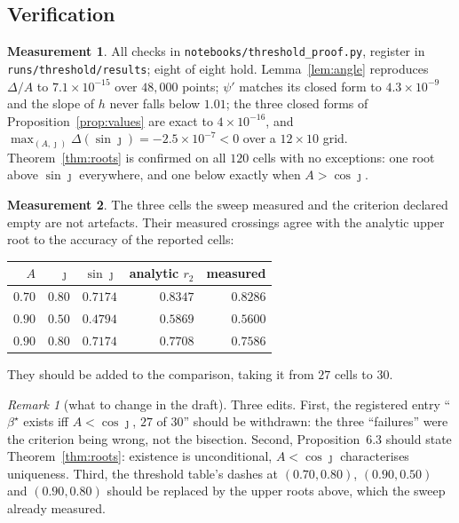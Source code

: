 \documentclass[11pt]{article}
\theoremstyle{definition}
\newtheorem{measurement}{Measurement}
\theoremstyle{remark}
\newtheorem{remark}{Remark}
\begin{document}
\subsection*{Verification}

\begin{measurement}
All checks in \texttt{notebooks/threshold\_proof.py}, register in
\texttt{runs/threshold/results}; eight of eight hold. Lemma~\ref{lem:angle} reproduces
$\Delta/A$ to $7.1\times10^{-15}$ over $48{,}000$ points; $\psi'$ matches its closed form to
$4.3\times10^{-9}$ and the slope of $h$ never falls below $1.01$; the three closed forms of
Proposition~\ref{prop:values} are exact to $4\times10^{-16}$, and
$\max_{(A,\jmath)}\Delta(\sin\jmath)=-2.5\times10^{-7}<0$ over a $12\times10$ grid.
Theorem~\ref{thm:roots} is confirmed on all $120$ cells with no exceptions: one root above
$\sin\jmath$ everywhere, and one below exactly when $A>\cos\jmath$.
\end{measurement}

\begin{measurement}\label{meas:recovered}
The three cells the sweep measured and the criterion declared empty are not artefacts. Their
measured crossings agree with the analytic upper root to the accuracy of the reported cells:
\begin{center}
\begin{tabular}{@{}rrrrr@{}}
\toprule
$A$ & $\jmath$ & $\sin\jmath$ & analytic $r_2$ & measured\\
\midrule
$0.70$ & $0.80$ & $0.7174$ & $0.8347$ & $0.8286$\\
$0.90$ & $0.50$ & $0.4794$ & $0.5869$ & $0.5600$\\
$0.90$ & $0.80$ & $0.7174$ & $0.7708$ & $0.7586$\\
\bottomrule
\end{tabular}
\end{center}
They should be added to the comparison, taking it from $27$ cells to $30$.
\end{measurement}

\begin{remark}[what to change in the draft]
Three edits. First, the registered entry ``$\beta^\star$ exists iff $A<\cos\jmath$, $27$ of
$30$'' should be withdrawn: the three ``failures'' were the criterion being wrong, not the
bisection. Second, Proposition~6.3 should state Theorem~\ref{thm:roots}: existence is
unconditional, $A<\cos\jmath$ characterises uniqueness. Third, the threshold table's dashes at
$(0.70,0.80)$, $(0.90,0.50)$ and $(0.90,0.80)$ should be replaced by the upper roots above,
which the sweep already measured.
\end{remark}
\end{document}
